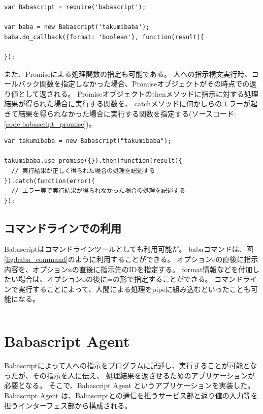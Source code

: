 \begin{lstlisting}[caption=コールバック関数の指定, label=code:babascriptux5fcallback]
var Babascript = require('babascript');

var baba = new Babascript('takumibaba');
baba.do_callback({format: 'boolean'}, function(result){

});
\end{lstlisting}

また、Promiseによる処理関数の指定も可能である。
人への指示構文実行時、コールバック関数を指定しなかった場合、Promiseオブジェクトがその時点での返り値として返される。
Promiseオブジェクトのthenメソッドに指示に対する処理結果が得られた場合に実行する関数を、
catchメソッドに何かしらのエラーが起きて結果を得られなかった場合に実行する関数を指定する(ソースコード:\ref{code:babascript_promise})。

\begin{lstlisting}[caption=Promiseによる関数指定, label=code:babascriptux5fpromise]
var takumibaba = new Babascript("takumibaba");

takumibaba.use_promise({}).then(function(result){
  // 実行結果が正しく得られた場合の処理を記述する
}).catch(function(error){
  // エラー等で実行結果が得られなかった場合の処理を記述する
});
\end{lstlisting}

\subsection{コマンドラインでの利用}\label{ux30b3ux30deux30f3ux30c9ux30e9ux30a4ux30f3ux3067ux306eux5229ux7528}

Babascriptはコマンドラインツールとしても利用可能だ。
babaコマンドは、図\ref{fig:baba_command}のように利用することができる。
オプションeの直後に指示内容を、オプションnの直後に指示先のIDを指定する。
format情報などを付加したい場合は、オプションoの後に=の形で指定することができる。
コマンドラインで実行することによって、人間による処理をpipeに組み込むといったことも可能になる。

\begin{lstlisting}[caption=Babaコマンド, label=babaux5fcommand]
% baba -e hogefuga -o format=boolean
\end{lstlisting}

\section{Babascript Agent}\label{babascript-agent}

Babascriptによって人への指示をプログラムに記述し、実行することが可能となったが、その指示を人に伝え、
処理結果を返させるためのアプリケーションが必要となる。
そこで、Babascript Agent というアプリケーションを実装した。 Babascript
Agent
は、Babascriptとの通信を担うサービス部と返り値の入力等を担うインターフェス部から構成される。

